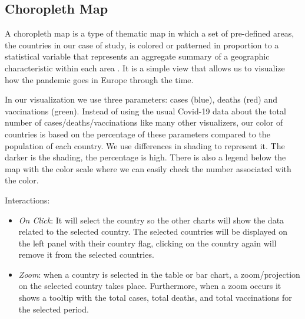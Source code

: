 \documentclass[10pt,conference]{IEEEtran}
\begin{document}
\subsection{Choropleth Map}
A choropleth map is a type of thematic map in which a set of pre-defined areas, the countries in our case of study, is colored or patterned in proportion to a statistical variable that represents an aggregate summary of a geographic characteristic within each area \cite{map}. It is a simple view that allows us to visualize how the pandemic goes in Europe through the time. 

In our visualization we use three parameters: cases (blue), deaths (red) and vaccinations (green). Instead of using the usual Covid-19 data about the total number of cases/deaths/vaccinations like many other visualizers, our color of countries is based on the percentage of these parameters compared to the population of each country. We use differences in shading to represent it. The darker is the shading, the percentage is high. There is also a legend below the map with the color scale where we can easily check the number associated with the color.

Interactions:
\begin{itemize}
 \item {\em On Click}: It will select the country so the other charts will show the data related to the selected country. The selected countries will be displayed on the left panel with their country flag, clicking on the country again will remove it from the selected countries.
 \item {\em Zoom}: when a country is selected in the table or bar chart, a zoom/projection on the selected country takes place. Furthermore, when a zoom occurs it shows a tooltip with the total cases, total deaths, and total vaccinations for the selected period.
\end{itemize}

\begin{figure}
\end{figure}
\end{document}
